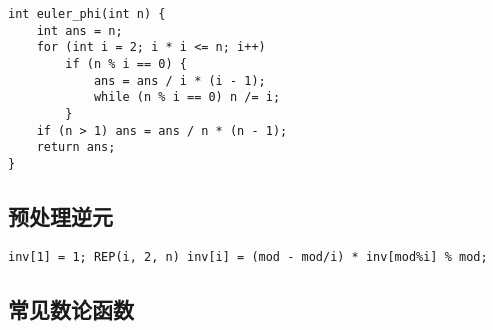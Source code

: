 \documentclass[a4paper,landscape,twocolumn]{ctexart}
\begin{document}
\begin{lstlisting}[]
int euler_phi(int n) {
	int ans = n;
	for (int i = 2; i * i <= n; i++)
		if (n % i == 0) {
			ans = ans / i * (i - 1);
			while (n % i == 0) n /= i;
		}
	if (n > 1) ans = ans / n * (n - 1);
	return ans;
}
\end{lstlisting}

\subsection{预处理逆元}

\begin{lstlisting}[]
inv[1] = 1; REP(i, 2, n) inv[i] = (mod - mod/i) * inv[mod%i] % mod;
\end{lstlisting}

%

\subsection{常见数论函数}
\end{document}
